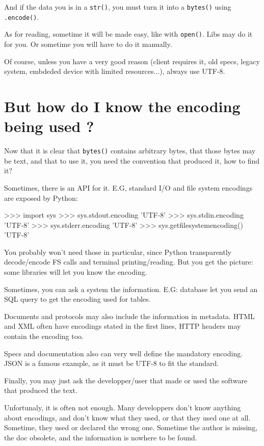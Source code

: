 And if the data you is in a \lstinline{str()}, you must turn it into a \lstinline{bytes()} using \lstinline{.encode()}.

As for reading, sometime it will be made easy, like with \lstinline{open()}. Libs may do it for you. Or sometime you will have to do it manually.

Of course, unless you have a very good reason (client requires it, old specs, legacy system, embdeded device with limited resources...), always use UTF-8.

\section{But how do I know the encoding being used ?}

Now that it is clear that \lstinline{bytes()} contains arbitrary bytes, that those bytes may be text, and that to use it, you need the convention that produced it, how to find it?

Sometimes, there is an API for it. E.G, standard I/O and file system encodings are exposed by Python:

\begin{py2and3}
>>> import sys
>>> sys.stdout.encoding
'UTF-8'
>>> sys.stdin.encoding
'UTF-8'
>>> sys.stderr.encoding
'UTF-8'
>>> sys.getfilesystemencoding()
'UTF-8'
\end{py2and3}

You probably won't need those in particular, since Python transparently decode/encode FS calls and terminal printing/reading. But you get the picture: some libraries will let you know the encoding.

Sometimes, you can ask a system the information. E.G: database let you send an SQL query to get the encoding used for tables.

Documents and protocols may also include the information in metadata. HTML and XML often have encodings stated in the first lines, HTTP headers may contain the encoding too.

Specs and documentation also can very well define the mandatory encoding. JSON is a famous example, as it must be UTF-8 to fit the standard.

Finally, you may just ask the developper/user that made or used the software that produced the text.

Unfortunaly, it is often not enough. Many developpers don't know anything about encodings, and don't know what they used, or that they used one at all. Sometime, they used or declared the wrong one. Sometime the author is missing, the doc obsolete, and the information is nowhere to be found.

